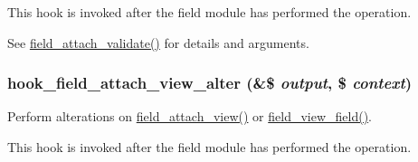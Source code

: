 This hook is invoked after the field module has performed the operation.

See \hyperlink{group__field__attach_gae56981a9c1006e9c54f695f0ed515cd1}{field\_\-attach\_\-validate()} for details and arguments. \hypertarget{group__field__attach_ga0c415aacfd70903f556fb67517dfe1ee}{
\subsubsection[{hook\_\-field\_\-attach\_\-view\_\-alter}]{\setlength{\rightskip}{0pt plus 5cm}hook\_\-field\_\-attach\_\-view\_\-alter (\&\$ {\em output}, \/  \$ {\em context})}}
\label{group__field__attach_ga0c415aacfd70903f556fb67517dfe1ee}
Perform alterations on \hyperlink{group__field__attach_gaa752a8fd31173fd2308d71eb059e00c7}{field\_\-attach\_\-view()} or \hyperlink{group__field_gacb7c7349bbe181c174421e23210ae1ba}{field\_\-view\_\-field()}.

This hook is invoked after the field module has performed the operation.


